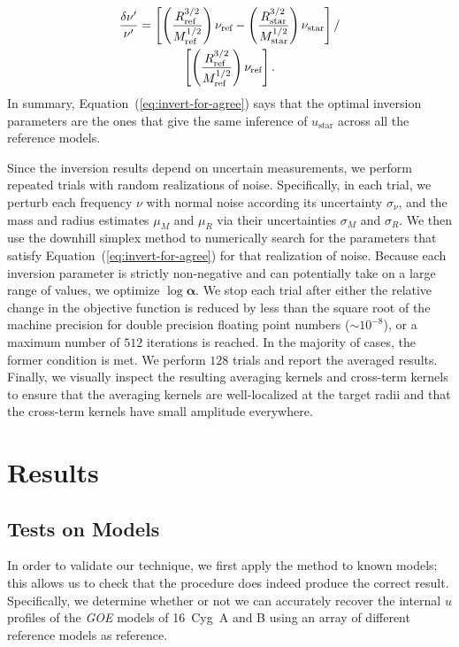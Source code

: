 \else
\begin{gather}
    \frac{\delta \nu'}{\nu'}
    =
    \left[
        \left(
            \frac{R_{\text{ref}}^{3/2}}{M_{\text{ref}}^{1/2}}
        \right) 
        \nu_{\text{ref}}
        -
        \left(
            \frac{R_{\text{star}}^{3/2}}{M_{\text{star}}^{1/2}}
        \right)
        \nu_{\text{star}}
    \right]
    / \notag \\
    \left[
        \left(
            \frac{R_{\text{ref}}^{3/2}}{M_{\text{ref}}^{1/2}}
        \right)
        \nu_{\text{ref}}
    \right]. 
\end{gather} 
\fi
In summary, Equation~(\ref{eq:invert-for-agree}) says that the optimal inversion parameters are the ones that give the same inference of $u_{\text{star}}$ across all the reference models. 


Since the inversion results depend on uncertain measurements, we perform repeated trials with random realizations of noise. 
Specifically, in each trial, we perturb each frequency $\nu$ with normal noise according its uncertainty $\sigma_{\nu}$, and the mass and radius estimates $\mu_M$ and $\mu_R$ via their uncertainties $\sigma_M$ and $\sigma_R$. 
We then use the %
downhill simplex method to numerically search for the parameters that satisfy Equation~(\ref{eq:invert-for-agree}) for that realization of noise. 
Because each inversion parameter is strictly non-negative and can potentially take on a large range of values, we optimize $\log \boldsymbol \alpha$. 
We stop each trial after either the relative change in the objective function is reduced by less than the square root of the machine precision for double precision floating point numbers (${\sim 10^{-8}}$), or a maximum number of $512$ iterations is reached. 
In the majority of cases, the former condition is met. 
We perform $128$ trials and report the averaged results. 
Finally, we visually inspect the resulting averaging kernels and cross-term kernels to ensure that the averaging kernels are well-localized at the target radii and that the cross-term kernels have small amplitude everywhere. 




%
%
%
%
\section{Results} 
\subsection{Tests on Models} 
In order to validate our technique, we first apply the method to known models; this allows us to check that the procedure does indeed produce the correct result.
Specifically, we determine whether or not we can accurately recover the internal $u$ profiles of the \emph{GOE} models of 16~Cyg~A and B using an array of different reference models as reference.

